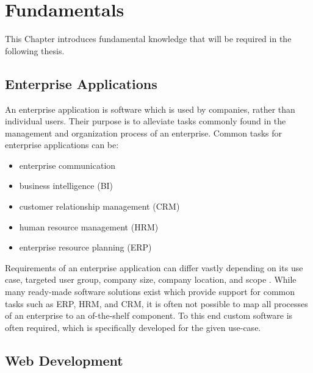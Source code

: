 \chapter{Fundamentals}
\label{ch:fundamentals}


This Chapter introduces fundamental knowledge that will be required in the following thesis.


\section{Enterprise Applications}
\label{sec:enterprise-applications}



An enterprise application is software which is used by companies, rather than individual users. Their purpose is to alleviate tasks commonly found in the management and organization process of an enterprise. Common tasks for enterprise applications can be:
\begin{itemize}
    \item enterprise communication
    \item business intelligence (BI)
    \item customer relationship management (CRM)
    \item human resource management (HRM)
    \item enterprise resource planning (ERP)
\end{itemize}

Requirements of an enterprise application can differ vastly depending on its use case, targeted user group, company size, company location, and scope \cite{noauthor_what_nodate,beal_what_2010}. While many ready-made software solutions exist which provide support for common tasks such as ERP, HRM, and CRM, it is often not possible to map all processes of an enterprise to an of-the-shelf component. To this end custom software is often required, which is specifically developed for the given use-case.

\section{Web Development}
\label{sec:web-development}

